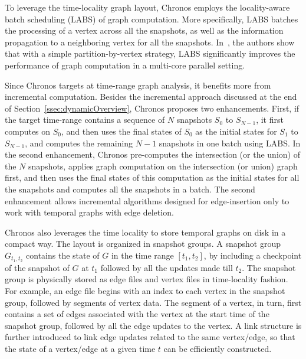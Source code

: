\documentclass{svjour3}
\begin{document}
\vspace{2mm}

 To leverage the time-locality graph layout, Chronos employs the locality-aware batch scheduling (LABS) of graph computation. More specifically, LABS batches the processing of a vertex across all the snapshots, as well as the information propagation to a neighboring vertex for all the snapshots. %
In~\cite{chronos}, the authors show that with a simple partition-by-vertex strategy, LABS significantly improves the performance of graph computation in a multi-core parallel setting.

\vspace{2mm}

 Since Chronos targets at time-range graph analysis, it benefits more from incremental computation. Besides the incremental approach discussed at the end of Section~\ref{ssec:dynamicOverview}, Chronos proposes two enhancements. First, if the target time-range contains a sequence of $N$ snapshots $S_0$ to $S_{N-1}$, it first computes on $S_0$, and then uses the final states of $S_0$ as the initial states for $S_1$ to $S_{N-1}$, and computes the remaining $N-1$ snapshots in one batch using LABS. In the second enhancement, Chronos pre-computes the intersection (or the union) of the $N$ snapshots, applies graph computation on the intersection (or union) graph first, and then uses the final states of this computation as the initial states for all the snapshots and computes all the snapshots in a batch. The second enhancement allows incremental algorithms designed for edge-insertion only to work with temporal graphs with edge deletion.

\vspace{2mm}

 Chronos also leverages the time locality to store temporal graphs on disk in a compact way. The layout is organized in snapshot groups. A snapshot group $G_{t_1,t_2}$ contains the state of $G$ in the time range $[t_1,t_2]$, by including a checkpoint of the snapshot of $G$ at $t_1$ followed by all the updates made till $t_2$. The snapshot group is physically stored as edge files and vertex files in time-locality fashion. For example, an edge file begins with an index to each vertex in the snapshot group, followed by segments of vertex data. The segment of a vertex, in turn, first contains a set of edges associated with the vertex at the start time of the snapshot group, followed by all the edge updates to the vertex. A link structure is further introduced to link edge updates related to the same vertex/edge, so that the state of a vertex/edge at a given time $t$ can be efficiently constructed.
\end{document}
